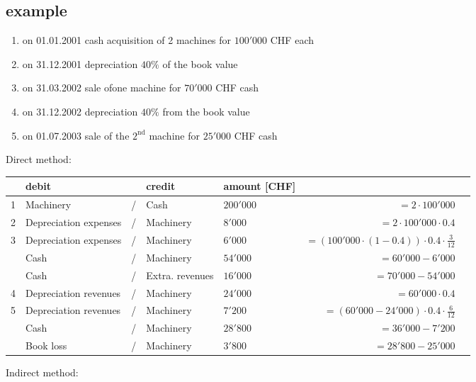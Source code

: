 \documentclass[a4paper] {scrartcl}
\begin{document}
\subsection{example} 
\begin{enumerate}
	\item on 01.01.2001 cash acquisition of 2 machines for $100'000$ CHF each
	\item on 31.12.2001 depreciation $40\%$ of the book value 
	\item on 31.03.2002 sale ofone machine for $70'000$ CHF cash
	\item on 31.12.2002 depreciation $40\%$ from the book value
	\item on 01.07.2003 sale of the $2^{\text{nd}}$ machine for $25'000$ CHF cash
\end{enumerate}

Direct method:

\begin{tabular}{lllllrl}
	&\textbf{debit} & & \textbf{credit} & \textbf{amount} [CHF]&\\
	\hline
	1&Machinery & / &  Cash & $200'000$&$=2\cdot100'000$\\
	2&Depreciation expenses& / & Machinery & $8'000$&$=2\cdot100'000\cdot0.4$\\
	3&Depreciation expenses& / & Machinery & $6'000$&$=(100'000\cdot(1-0.4))\cdot0.4\cdot\frac{3}{12}$\\
	&Cash& / & Machinery & $54'000$&$=60'000-6'000$\\
	&Cash& / & Extra. revenues & $16'000$&$=70'000-54'000$\\
	
	4&Depreciation revenues& / & Machinery & $24'000$&$=60'000\cdot0.4$\\
	5&Depreciation revenues& / & Machinery & $7'200$&$=(60'000-24'000)\cdot0.4\cdot\frac{6}{12}$\\
	&Cash& / & Machinery & $28'800$& $=36'000-7'200$\\
	&Book loss& / & Machinery & $3'800$& $=28'800-25'000$\\
\end{tabular}

Indirect method:
\end{document}
